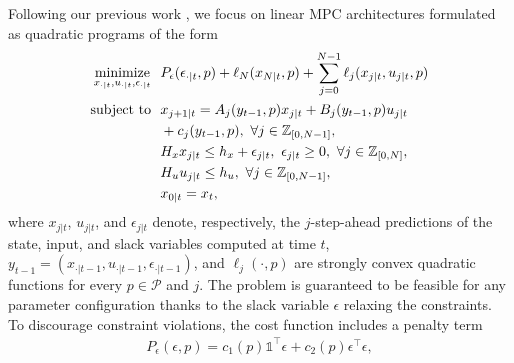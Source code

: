 \documentclass[journal,twoside,web,final]{ieeecolor}
\theoremstyle{definition}
\newcommand{\Z}{\mathbb{Z}}
\begin{document}
Following our previous work \cite{zuliani2023bp}, we focus on linear MPC architectures formulated as quadratic programs of the form
\begin{align}
\operatorname*{minimize}_{x_{\cdot|t},u_{\cdot|t},\epsilon_{\cdot|t}} & ~~  P_\epsilon(\epsilon_{\cdot|t},p) + \ell_N(x_{N|t},p) + \sum_{j=0}^{N-1} \ell_j(x_{j|t},u_{j|t},p) \notag \\
\text{subject to} & ~~ x_{j+1|t}=A_j(y_{t-1},p) x_{j|t} + B_j(y_{t-1},p) u_{j|t} \notag \\ & ~~ + c_j(y_{t-1},p),~ \forall j\in\Z_{[0,N-1]}, \notag \\ 
& ~~ H_x x_{j|t} \leq h_x + \epsilon_{j|t} ,~\epsilon_{j|t} \geq 0,~ \forall j\in\Z_{[0,N]}, \notag \\
& ~~ H_u u_{j|t} \leq h_u,~ \forall j\in\Z_{[0,N-1]}, \notag \\
& ~~ x_{0|t} = x_t, \label{eq:MPC}
\end{align}
where $x_{j|t}$, $u_{j|t}$, and $\epsilon_{j|t}$ denote, respectively, the $j$-step-ahead predictions of the state, input, and slack variables computed at time $t$, $y_{t-1}=(x_{\cdot|t-1},u_{\cdot|t-1},\epsilon_{\cdot|t-1})$, and $\ell_j(\cdot,p)$ are strongly convex quadratic functions for every $p\in\mathcal{P}$ and $j$. 
The problem is guaranteed to be feasible for any parameter configuration thanks to the slack variable $\epsilon$ relaxing the constraints. 
To discourage constraint violations, the cost function includes a penalty term
\begin{align}
P_\epsilon(\epsilon,p) = c_1(p) \mathds{1}^\top \epsilon + c_2(p) \epsilon^\top \epsilon, \label{eq:problem_formulation:mpc_slack_penalty}
\end{align}
\end{document}
